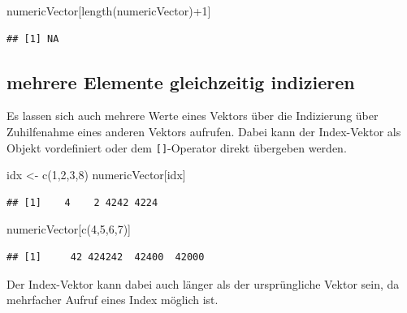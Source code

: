 \documentclass[
]{book}
\newenvironment{Shaded}{\begin{snugshade}}{\end{snugshade}}
\newcommand{\DecValTok}[1]{\textcolor[rgb]{0.00,0.00,0.81}{#1}}
\newcommand{\FunctionTok}[1]{\textcolor[rgb]{0.00,0.00,0.00}{#1}}
\newcommand{\NormalTok}[1]{#1}
\newcommand{\OtherTok}[1]{\textcolor[rgb]{0.56,0.35,0.01}{#1}}
\newcommand{\SpecialCharTok}[1]{\textcolor[rgb]{0.00,0.00,0.00}{#1}}
\begin{document}
\begin{Shaded}
\begin{Highlighting}[]
\NormalTok{numericVector[}\FunctionTok{length}\NormalTok{(numericVector)}\SpecialCharTok{+}\DecValTok{1}\NormalTok{]}
\end{Highlighting}
\end{Shaded}

\begin{verbatim}
## [1] NA
\end{verbatim}

\hypertarget{mehrere-elemente-gleichzeitig-indizieren}{%
\subsection{mehrere Elemente gleichzeitig indizieren}\label{mehrere-elemente-gleichzeitig-indizieren}}

Es lassen sich auch mehrere Werte eines Vektors über die Indizierung über Zuhilfenahme eines anderen Vektors aufrufen. Dabei kann der Index-Vektor als Objekt vordefiniert oder dem \texttt{{[}{]}}-Operator direkt übergeben werden.

\begin{Shaded}
\begin{Highlighting}[]
\NormalTok{idx }\OtherTok{\textless{}{-}} \FunctionTok{c}\NormalTok{(}\DecValTok{1}\NormalTok{,}\DecValTok{2}\NormalTok{,}\DecValTok{3}\NormalTok{,}\DecValTok{8}\NormalTok{)}
\NormalTok{numericVector[idx]}
\end{Highlighting}
\end{Shaded}

\begin{verbatim}
## [1]    4    2 4242 4224
\end{verbatim}

\begin{Shaded}
\begin{Highlighting}[]
\NormalTok{numericVector[}\FunctionTok{c}\NormalTok{(}\DecValTok{4}\NormalTok{,}\DecValTok{5}\NormalTok{,}\DecValTok{6}\NormalTok{,}\DecValTok{7}\NormalTok{)]}
\end{Highlighting}
\end{Shaded}

\begin{verbatim}
## [1]     42 424242  42400  42000
\end{verbatim}

Der Index-Vektor kann dabei auch länger als der ursprüngliche Vektor sein, da mehrfacher Aufruf eines Index möglich ist.
\end{document}
